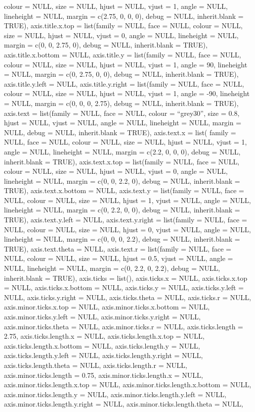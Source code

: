 \documentclass[
  man,floatsintext]{apa6}
\begin{document}
colour = NULL, size = NULL, hjust = NULL, vjust = 1, angle = NULL, lineheight = NULL, margin = c(2.75, 0, 0, 0), debug = NULL, inherit.blank = TRUE), axis.title.x.top = list(family = NULL, face = NULL, colour = NULL, size = NULL, hjust = NULL, vjust = 0, angle = NULL, lineheight = NULL, margin = c(0, 0, 2.75, 0), debug = NULL, inherit.blank = TRUE), axis.title.x.bottom = NULL, axis.title.y = list(family = NULL, face = NULL, colour = NULL, size = NULL, hjust = NULL, vjust = 1, angle = 90, lineheight = NULL,
margin = c(0, 2.75, 0, 0), debug = NULL, inherit.blank = TRUE), axis.title.y.left = NULL, axis.title.y.right = list(family = NULL, face = NULL, colour = NULL, size = NULL, hjust = NULL, vjust = 1, angle = -90, lineheight = NULL, margin = c(0, 0, 0, 2.75), debug = NULL, inherit.blank = TRUE), axis.text = list(family = NULL, face = NULL, colour = ``grey30'', size = 0.8, hjust = NULL, vjust = NULL, angle = NULL, lineheight = NULL, margin = NULL, debug = NULL, inherit.blank = TRUE), axis.text.x = list(
family = NULL, face = NULL, colour = NULL, size = NULL, hjust = NULL, vjust = 1, angle = NULL, lineheight = NULL, margin = c(2.2, 0, 0, 0), debug = NULL, inherit.blank = TRUE), axis.text.x.top = list(family = NULL, face = NULL, colour = NULL, size = NULL, hjust = NULL, vjust = 0, angle = NULL, lineheight = NULL, margin = c(0, 0, 2.2, 0), debug = NULL, inherit.blank = TRUE), axis.text.x.bottom = NULL, axis.text.y = list(family = NULL, face = NULL, colour = NULL, size = NULL, hjust = 1, vjust = NULL,
angle = NULL, lineheight = NULL, margin = c(0, 2.2, 0, 0), debug = NULL, inherit.blank = TRUE), axis.text.y.left = NULL, axis.text.y.right = list(family = NULL, face = NULL, colour = NULL, size = NULL, hjust = 0, vjust = NULL, angle = NULL, lineheight = NULL, margin = c(0, 0, 0, 2.2), debug = NULL, inherit.blank = TRUE), axis.text.theta = NULL, axis.text.r = list(family = NULL, face = NULL, colour = NULL, size = NULL, hjust = 0.5, vjust = NULL, angle = NULL, lineheight = NULL, margin = c(0, 2.2,
0, 2.2), debug = NULL, inherit.blank = TRUE), axis.ticks = list(), axis.ticks.x = NULL, axis.ticks.x.top = NULL, axis.ticks.x.bottom = NULL, axis.ticks.y = NULL, axis.ticks.y.left = NULL, axis.ticks.y.right = NULL, axis.ticks.theta = NULL, axis.ticks.r = NULL, axis.minor.ticks.x.top = NULL, axis.minor.ticks.x.bottom = NULL, axis.minor.ticks.y.left = NULL, axis.minor.ticks.y.right = NULL, axis.minor.ticks.theta = NULL, axis.minor.ticks.r = NULL, axis.ticks.length = 2.75, axis.ticks.length.x = NULL,
axis.ticks.length.x.top = NULL, axis.ticks.length.x.bottom = NULL, axis.ticks.length.y = NULL, axis.ticks.length.y.left = NULL, axis.ticks.length.y.right = NULL, axis.ticks.length.theta = NULL, axis.ticks.length.r = NULL, axis.minor.ticks.length = 0.75, axis.minor.ticks.length.x = NULL, axis.minor.ticks.length.x.top = NULL, axis.minor.ticks.length.x.bottom = NULL, axis.minor.ticks.length.y = NULL, axis.minor.ticks.length.y.left = NULL, axis.minor.ticks.length.y.right = NULL, axis.minor.ticks.length.theta = NULL,
\end{document}
